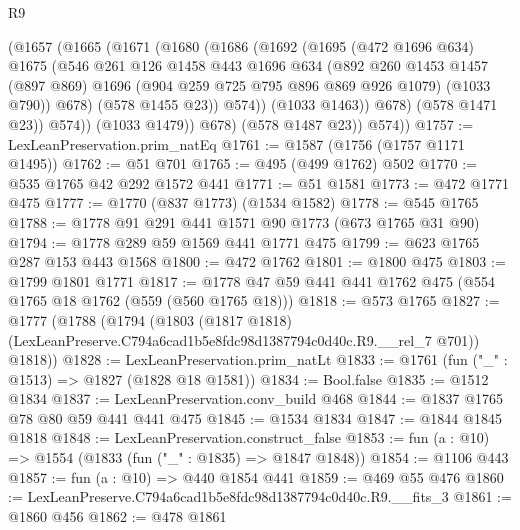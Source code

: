 \begin{lexlean}{R9}
\begin{coremodule}
                (@1657
                  (@1665
                    (@1671
                      (@1680
                        (@1686
                          (@1692
                            (@1695
                              (@472 @1696 @634)
                              @1675
                              (@546
                                @261
                                @126
                                @1458
                                @443
                                @1696
                                @634
                                (@892
                                  @260
                                  @1453
                                  @1457
                                  (@897 @869)
                                  @1696
                                  (@904 @259 @725 @795 @896 @869 @926 @1079)
                                  (@1033 @790))
                                @678)
                              (@578 @1455 @23))
                            @574))
                        (@1033 @1463))
                      @678)
                    (@578 @1471 @23))
                  @574))
              (@1033 @1479))
            @678)
          (@578 @1487 @23))
        @574))
@1757 := LexLeanPreservation.prim_natEq
@1761 := @1587 (@1756 (@1757 @1171 @1495))
@1762 := @51 @701
@1765 := @495 (@499 @1762) @502
@1770 := @535 @1765 @42 @292 @1572 @441
@1771 := @51 @1581
@1773 := @472 @1771 @475
@1777 := @1770 (@837 @1773) (@1534 @1582)
@1778 := @545 @1765
@1788 := @1778 @91 @291 @441 @1571 @90 @1773 (@673 @1765 @31 @90)
@1794 := @1778 @289 @59 @1569 @441 @1771 @475
@1799 := @623 @1765 @287 @153 @443 @1568
@1800 := @472 @1762
@1801 := @1800 @475
@1803 := @1799 @1801 @1771
@1817 := @1778 @47 @59 @441 @441 @1762 @475 (@554 @1765 @18 @1762 (@559 (@560 @1765 @18)))
@1818 := @573 @1765
@1827 := @1777
    (@1788
      (@1794
        (@1803 (@1817 @1818) (LexLeanPreserve.C794a6cad1b5e8fdc98d1387794c0d40c.R9.__rel_7 @701))
        @1818))
@1828 := LexLeanPreservation.prim_natLt
@1833 := @1761 (fun ("_" : @1513) => @1827 (@1828 @18 @1581))
@1834 := Bool.false
@1835 := @1512 @1834
@1837 := LexLeanPreservation.conv_build @468
@1844 := @1837 @1765 @78 @80 @59 @441 @441 @475
@1845 := @1534 @1834
@1847 := @1844 @1845 @1818
@1848 := LexLeanPreservation.construct_false
@1853 := fun (a : @10) => @1554 (@1833 (fun ("_" : @1835) => @1847 @1848))
@1854 := @1106 @443
@1857 := fun (a : @10) => @440 @1854 @441
@1859 := @469 @55 @476
@1860 := LexLeanPreserve.C794a6cad1b5e8fdc98d1387794c0d40c.R9.__fits_3
@1861 := @1860 @456
@1862 := @478 @1861

\end{coremodule}
\end{lexlean}
